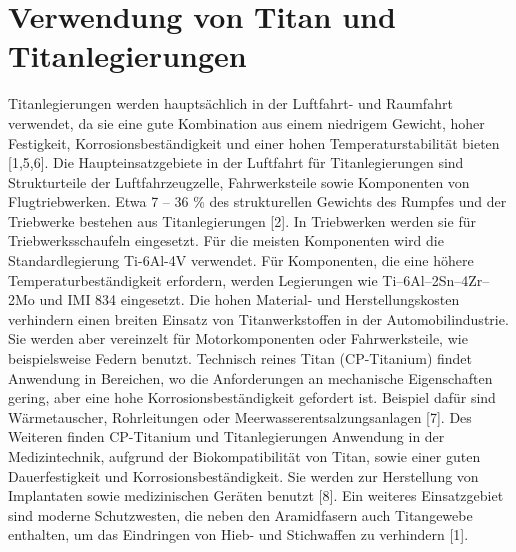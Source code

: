 \section{Verwendung von Titan und Titanlegierungen 	}
Titanlegierungen werden hauptsächlich in der Luftfahrt- und Raumfahrt verwendet, da sie eine gute Kombination aus einem niedrigem Gewicht, hoher Festigkeit, Korrosionsbeständigkeit und einer hohen Temperaturstabilität bieten [1,5,6]. Die Haupteinsatzgebiete in der Luftfahrt für Titanlegierungen sind Strukturteile der Luftfahrzeugzelle, Fahrwerksteile sowie Komponenten von Flugtriebwerken. Etwa 7 -- 36 \% des strukturellen Gewichts des Rumpfes und der Triebwerke bestehen aus Titanlegierungen [2]. In Triebwerken werden sie für Triebwerksschaufeln eingesetzt. Für die meisten Komponenten wird die Standardlegierung Ti-6Al-4V verwendet. Für Komponenten, die eine höhere Temperaturbeständigkeit erfordern, werden Legierungen wie Ti–6Al–2Sn–4Zr–2Mo und IMI 834 eingesetzt. Die hohen Material- und Herstellungskosten verhindern einen breiten Einsatz von Titanwerkstoffen in der Automobilindustrie. Sie werden aber vereinzelt für Motorkomponenten oder Fahrwerksteile, wie beispielsweise Federn benutzt. Technisch reines Titan (CP-Titanium) findet Anwendung in Bereichen, wo die Anforderungen an mechanische Eigenschaften gering, aber eine hohe Korrosionsbeständigkeit gefordert ist. Beispiel dafür sind Wärmetauscher, Rohrleitungen oder Meerwasserentsalzungsanlagen [7]. Des Weiteren finden CP-Titanium und Titanlegierungen Anwendung in der Medizintechnik, aufgrund der Biokompatibilität von Titan, sowie einer guten Dauerfestigkeit und Korrosionsbeständigkeit. Sie werden zur Herstellung von Implantaten sowie medizinischen Geräten benutzt [8]. Ein weiteres Einsatzgebiet sind moderne Schutzwesten, die neben den Aramidfasern auch Titangewebe enthalten, um das Eindringen von Hieb- und Stichwaffen zu verhindern [1]. 

